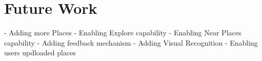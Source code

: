 \section{Future Work}
- Adding more Places
- Enabling Explore capability
- Enabling Near Places capability
- Adding feedback mechanism
- Adding Visual Recognition
- Enabling users updloaded places
